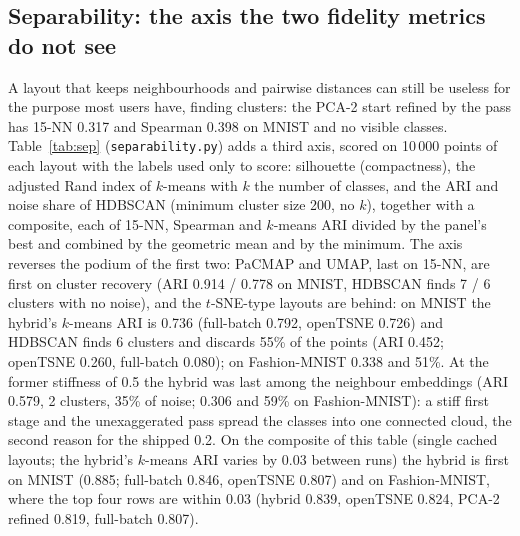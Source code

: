 \documentclass[11pt]{article}
\begin{document}
\begin{table}[t]
\centering\small
\caption{Neighbourhood scale on MNIST 70k, same layouts as Fig.~\ref{fig:layouts}: kNN preservation at
$k = 5$ to 100, trustworthiness and continuity at $k = 15$ and 50 (\texttt{extra\_metrics.py}; single
layouts).}

\label{tab:kscale}
\end{table}

\begin{table}[t]
\centering\small
\caption{Where the global score comes from, MNIST 70k, same layouts: distance Spearman on the 2000-point
sample split by class membership and by tercile of the input distance (terciles at 9.64 / 10.81), and
Spearman of the 45 inter-centroid distances (\texttt{global\_strata.py}; one layout per method, see
Table~\ref{tab:seeds} for the dispersion of the last column).}
\resizebox{\textwidth}{!}{}
\label{tab:strata}
\end{table}

\subsection{Separability: the axis the two fidelity metrics do not see}\label{sec:sep}
A layout that keeps neighbourhoods and pairwise distances can still be useless for the purpose most
users have, finding clusters: the PCA-2 start refined by the pass has 15-NN 0.317 and Spearman 0.398 on
MNIST and no visible classes. Table~\ref{tab:sep} (\texttt{separability.py}) adds a third axis, scored
on 10\,000 points of each layout with the labels used only to score: silhouette (compactness), the
adjusted Rand index of $k$-means with $k$ the number of classes, and the ARI and noise share of HDBSCAN
(minimum cluster size 200, no $k$), together with a composite, each of 15-NN, Spearman and $k$-means ARI
divided by the panel's best and combined by the geometric mean and by the minimum. The axis reverses the
podium of the first two: PaCMAP and UMAP, last on 15-NN, are first on cluster recovery (ARI 0.914 /
0.778 on MNIST, HDBSCAN finds 7 / 6 clusters with no noise), and the $t$-SNE-type layouts are behind: on MNIST
the hybrid's $k$-means ARI is 0.736 (full-batch 0.792, openTSNE 0.726) and HDBSCAN finds 6 clusters and discards
55\% of the points (ARI 0.452; openTSNE 0.260, full-batch 0.080); on Fashion-MNIST 0.338 and 51\%. At the former
stiffness of 0.5 the hybrid was last among the neighbour embeddings (ARI 0.579, 2 clusters, 35\% of noise; 0.306 and 59\% on
Fashion-MNIST): a stiff first stage and the unexaggerated pass spread the classes into one connected
cloud, the second reason for the shipped 0.2. On the composite of this table (single cached layouts; the hybrid's
$k$-means ARI varies by 0.03 between runs) the hybrid is first on MNIST (0.885; full-batch 0.846, openTSNE 0.807)
and on Fashion-MNIST, where the top four rows are
within 0.03 (hybrid 0.839, openTSNE 0.824, PCA-2 refined 0.819, full-batch 0.807).
\end{document}
